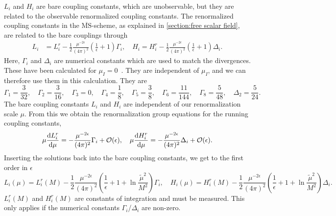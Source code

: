 $L_i$ and $H_i$  are bare coupling constants, which are unobservable, but they are related to the observable renormalized coupling constants.
The renormalized coupling constants in the $\overline{\mathrm{MS}}$-scheme, as explained in \autoref{section:free scalar field}, are related to the bare couplings through
%
\begin{align}
    L_i 
    & = 
    L_i^r 
    -
    \frac{1}{2} \frac{\mu^{-2\epsilon}} {(4 \pi)^2}
    \left(\frac{1}{\epsilon} + 1 \right) \Gamma_i, \quad
    H_i = 
    H_i^r
    -  \frac{1}{2}  \frac{\mu^{-2\epsilon}}{(4 \pi)^2} 
    \left(\frac{1}{\epsilon} + 1 \right) \Delta_i .
\end{align}
%
Here, $\Gamma_i$ and $\Delta_i$ are numerical constants which are used to match the divergences.
These have been calculated for $\mu_I = 0$~\autocite{gasserChiralPerturbationTheory1985}.
They are independent of $\mu_I$, and we can therefore use them in this calculation.
They are
\begin{equation}
    \Gamma_1 = \frac{3}{32}, \quad
    \Gamma_2 = \frac{3}{16}, \quad
    \Gamma_3 = 0, \quad
    \Gamma_4 = \frac{1}{8}, \quad
    \Gamma_5 = \frac{3}{8}, \quad
    \Gamma_6 = \frac{11}{144}, \quad
    \Gamma_8 = \frac{5}{48}, \quad
    \Delta_2 = \frac{5}{24}.
\end{equation}
%
The bare coupling constants $L_i$ and $H_i$ are independent of our renormalization scale $\mu$.
From this we obtain the renormalization group equations for the running coupling constants,
\begin{equation}
    \mu \diff{L_i^r}{\mu } 
    = - \frac{  \mu^{-2\epsilon} }{(4 \pi)^2} \Gamma_i + \mathcal{O}(\epsilon), \quad
    \mu \diff{H_i^r}{\mu } 
    = - \frac{ \mu^{-2\epsilon}}{(4 \pi)^2} \Delta_i + \mathcal{O}(\epsilon).
\end{equation}
%
Inserting the solutions back into the bare coupling constants, we get to the first order in $\epsilon$
%
\begin{equation}
    L_i(\mu)
    = 
    L_i^r(M)
    - \frac{1}{2} \frac{\mu^{-2\epsilon}} {(4 \pi)^2}
    \left(\frac{1}{\epsilon} + 1 + \ln{\frac{\tilde \mu^2}{M^2}}\right) \Gamma_i,
    \quad
    H_i (\mu)
    = 
    H_i^r (M)
    - \frac{1}{2} \frac{\mu^{-2\epsilon}} {(4 \pi)^2}
    \left(\frac{1}{\epsilon} + 1 + \ln{\frac{\tilde \mu^2}{M^2}}\right) \Delta_i.
\end{equation}
%
$L_i^r(M)$ and $H_i^r(M)$ are constants of integration and must be measured.
This only applies if the numerical constants $\Gamma_i$/$\Delta_i$ are non-zero.

